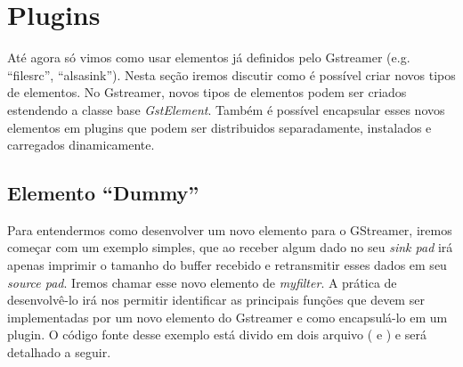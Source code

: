\section{Plugins}
\label{sec:plugins}


Até agora só vimos como usar elementos já definidos pelo Gstreamer (e.g.
``filesrc'', ``alsasink'').  Nesta seção iremos discutir como é possível criar
novos tipos de elementos.  No Gstreamer, novos tipos de elementos podem ser
criados estendendo a classe base \emph{GstElement}.  Também é possível encapsular
esses novos elementos em plugins que podem ser distribuidos separadamente,
instalados e carregados dinamicamente. 



\subsection*{Elemento ``Dummy''}
Para entendermos como desenvolver um novo elemento para  o GStreamer, iremos
começar com um exemplo simples, que ao receber algum dado no seu \emph{sink
pad} irá apenas imprimir o tamanho do buffer recebido e retransmitir esses
dados em seu \emph{source pad}.  Iremos chamar esse novo elemento de
\emph{myfilter}.  A prática de desenvolvê-lo irá nos permitir identificar as
principais funções que devem ser implementadas por um novo elemento do
Gstreamer e como encapsulá-lo em um plugin.  O código fonte desse exemplo está
divido em dois arquivo ( e ) e será detalhado a
seguir.


